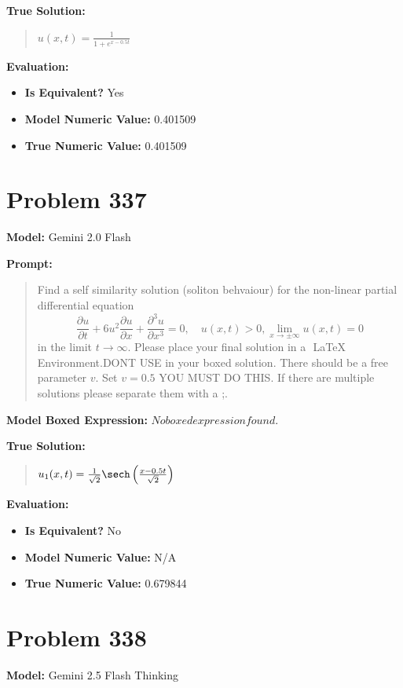 \documentclass{article}
\begin{document}
{\textbf{True Solution:}
\begin{quote}
$u(x, t) = \frac{1}{1 + e^{x - 0.5t}}$
\end{quote}

\textbf{Evaluation:}
\begin{itemize}
\item \textbf{Is Equivalent?} Yes
\item \textbf{Model Numeric Value:} 0.401509
\item \textbf{True Numeric Value:} 0.401509
\end{itemize}
\vspace{1cm}
\section*{Problem 337}
\textbf{Model:} Gemini 2.0 Flash

\textbf{Prompt:}
\begin{quote}
Find a self similarity solution (soliton behvaiour) for the non-linear partial differential equation $$ \frac{\partial u}{\partial t} + 6 u^2 \frac{\partial u}{\partial x} + \frac{\partial^3 u}{\partial x^3} = 0, \quad u(x, t) > 0, \lim_{x \to \pm \infty} u(x,t) = 0 $$ in the limit $t \rightarrow \infty $. Please place your final solution in a $\boxed{}$ LaTeX Environment.DONT USE \operatorname in your boxed solution. There should be a free parameter $v$. Set $v=0.5$ YOU MUST DO THIS. If there are multiple solutions please separate them with a ;.
\end{quote}
\textbf{Model Boxed Expression:} $No boxed expression found.$

\textbf{True Solution:}
\begin{quote}
$u_1(x, t) = \frac{1}{\sqrt{2}} \sech\left(\frac{x - 0.5t}{\sqrt{2}}\right)$
\end{quote}

\textbf{Evaluation:}
\begin{itemize}
\item \textbf{Is Equivalent?} No
\item \textbf{Model Numeric Value:} N/A
\item \textbf{True Numeric Value:} 0.679844
\end{itemize}
\vspace{1cm}
\section*{Problem 338}
\textbf{Model:} Gemini 2.5 Flash Thinking

}
\end{document}
